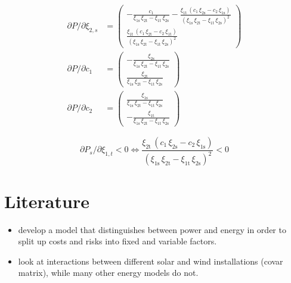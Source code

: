 \documentclass[12pt,a4paper]{extarticle}
\begin{document}
\begin{align*}
\partial P / \partial \xi_{2,s} &= \left(\begin{array}{c} -\frac{c_{1}}{\xi _{\mathrm{1s}}\,\xi _{\mathrm{2t}}-\xi _{\mathrm{1t}}\,\xi _{\mathrm{2s}}}-\frac{\xi _{\mathrm{1t}}\,\left(c_{1}\,\xi _{\mathrm{2s}}-c_{2}\,\xi _{\mathrm{1s}}\right)}{{\left(\xi _{\mathrm{1s}}\,\xi _{\mathrm{2t}}-\xi _{\mathrm{1t}}\,\xi _{\mathrm{2s}}\right)}^2}\\ \frac{\xi _{\mathrm{1t}}\,\left(c_{1}\,\xi _{\mathrm{2t}}-c_{2}\,\xi _{\mathrm{1t}}\right)}{{\left(\xi _{\mathrm{1s}}\,\xi _{\mathrm{2t}}-\xi _{\mathrm{1t}}\,\xi _{\mathrm{2s}}\right)}^2} \end{array}\right) \\
\partial P / \partial c_1 &= \left(\begin{array}{c} -\frac{\xi _{\mathrm{2s}}}{\xi _{\mathrm{1s}}\,\xi _{\mathrm{2t}}-\xi _{\mathrm{1t}}\,\xi _{\mathrm{2s}}}\\ \frac{\xi _{\mathrm{2t}}}{\xi _{\mathrm{1s}}\,\xi _{\mathrm{2t}}-\xi _{\mathrm{1t}}\,\xi _{\mathrm{2s}}} \end{array}\right)\\
\partial P / \partial c_2 &= \left(\begin{array}{c} \frac{\xi _{\mathrm{1s}}}{\xi _{\mathrm{1s}}\,\xi _{\mathrm{2t}}-\xi _{\mathrm{1t}}\,\xi _{\mathrm{2s}}}\\ -\frac{\xi _{\mathrm{1t}}}{\xi _{\mathrm{1s}}\,\xi _{\mathrm{2t}}-\xi _{\mathrm{1t}}\,\xi _{\mathrm{2s}}} \end{array}\right)
\end{align*}

$$ \partial P_s / \partial \xi_{1,t} < 0 \iff  \frac{\xi _{\mathrm{2t}}\,\left(c_{1}\,\xi _{\mathrm{2s}}-c_{2}\,\xi _{\mathrm{1s}}\right)}{{\left(\xi _{\mathrm{1s}}\,\xi _{\mathrm{2t}}-\xi _{\mathrm{1t}}\,\xi _{\mathrm{2s}}\right)}^2}<0$$


\pagebreak

\section{Literature}

\begin{itemize}
	\item \cite{Delarue} develop a model that distinguishes between power and energy in order to split up costs and risks into fixed and variable factors. 
	\item \cite{SB2018} look at interactions between different solar and wind installations (covar matrix), while many other energy models do not.
\end{itemize}
\end{document}
